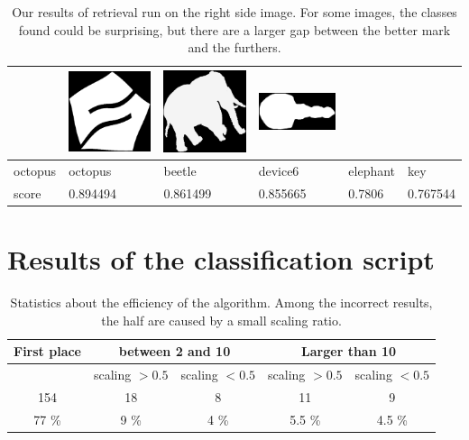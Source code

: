 \begin{table}[h!]
\begin{tabular}{ | m{2.2cm} | m{2.2cm} | m{2.2cm} | m{2.2cm} | m{2.2cm} | m{2.2cm} | }
\begin{minipage}{.3\textwidth}
    \end{minipage}
	&
	\begin{minipage}{.3\textwidth}
      \includegraphics[width=\linewidth, width=20mm]{images/device6-exp2}
    \end{minipage}
	&
    \begin{minipage}{.3\textwidth}
      \includegraphics[width=\linewidth, width=20mm]{images/elephant}
    \end{minipage}
	&
    \begin{minipage}{.3\textwidth}
      \includegraphics[width=\linewidth, width=20mm]{images/key}
    \end{minipage}
	\\ \hline
	octopus & octopus & beetle & device6 & elephant & key \\ \hline
	score & 0.894494 & 0.861499 & 0.855665 & 0.7806 & 0.767544 \\ \hline
  \end{tabular}
  \caption{Our results of retrieval run on the right side image. For some images, the classes found could be surprising, but there are a larger gap between the better mark and the furthers.}
  \label{results}
\end{table}

\section{Results of the classification script}

\begin{table}[h!]
\centering
\begin{tabular}{|c|c|c|c|c|}
   \hline
   First place & \multicolumn{2}{c|}{between 2 and 10} & \multicolumn{2}{c|}{ Larger than 10} \\
   \hline
    & scaling $>0.5$ & scaling $<0.5$ & scaling $>0.5$ & scaling $<0.5$ \\
   \hline
   154 & 18 & 8 & 11 & 9 \\
   \hline
   77 \% & 9 \% & 4 \% & 5.5 \% & 4.5 \% \\
   \hline
\end{tabular}
\caption{Statistics about the efficiency of the algorithm. Among the incorrect results, the half are caused by a small scaling ratio.}
\label{results-fast}
\end{table}



